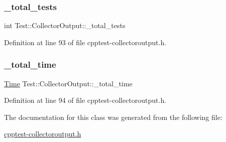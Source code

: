 \subsubsection{\texorpdfstring{\+\_\+total\+\_\+tests}{\_total\_tests}}
{\footnotesize\ttfamily int Test\+::\+Collector\+Output\+::\+\_\+total\+\_\+tests\hspace{0.3cm}{\ttfamily [protected]}}



Definition at line 93 of file cpptest-\/collectoroutput.\+h.

\mbox{\label{class_test_1_1_collector_output_af1e014fde4bf5b4e6c89de748630aa79}} 
\subsubsection{\texorpdfstring{\+\_\+total\+\_\+time}{\_total\_time}}
{\footnotesize\ttfamily \mbox{\hyperlink{class_test_1_1_time}{Time}} Test\+::\+Collector\+Output\+::\+\_\+total\+\_\+time\hspace{0.3cm}{\ttfamily [protected]}}



Definition at line 94 of file cpptest-\/collectoroutput.\+h.



The documentation for this class was generated from the following file\+:\begin{DoxyCompactItemize}
\item 
\mbox{\hyperlink{cpptest-collectoroutput_8h}{cpptest-\/collectoroutput.\+h}}\end{DoxyCompactItemize}
